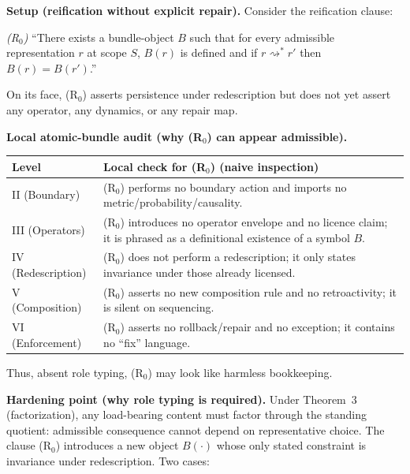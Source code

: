 \documentclass[12pt]{article}
\theoremstyle{plain}
\begin{document}
\medskip

\noindent\textbf{Setup (reification without explicit repair).} Consider the reification clause:

\medskip
\centerline{\emph{(R$_0$)} ``There exists a bundle-object $B$ such that for every admissible representation $r$ at scope $S$, $B(r)$ is defined and if $r\rightsquigarrow^* r'$ then $B(r)=B(r')$.''}
\medskip

On its face, (R$_0$) asserts persistence under redescription but does not yet assert any operator, any dynamics, or any repair map.

\medskip

\noindent\textbf{Local atomic-bundle audit (why (R$_0$) can appear admissible).}

\renewcommand{\arraystretch}{1.15}
\begin{tabular}{@{}p{}p{}@{}}
\toprule
\textbf{Level} & \textbf{Local check for (R$_0$) (naive inspection)}\\
\midrule
II (Boundary) & (R$_0$) performs no boundary action and imports no metric/probability/causality.\\
III (Operators) & (R$_0$) introduces no operator envelope and no licence claim; it is phrased as a definitional existence of a symbol $B$.\\
IV (Redescription) & (R$_0$) does not perform a redescription; it only states invariance under those already licensed.\\
V (Composition) & (R$_0$) asserts no new composition rule and no retroactivity; it is silent on sequencing.\\
VI (Enforcement) & (R$_0$) asserts no rollback/repair and no exception; it contains no ``fix'' language.\\
\bottomrule
\end{tabular}

\medskip

Thus, absent role typing, (R$_0$) may look like harmless bookkeeping.

\medskip

\noindent\textbf{Hardening point (why role typing is required).} Under Theorem~3 (factorization), any load-bearing content must factor through the standing quotient: admissible consequence cannot depend on representative choice. The clause (R$_0$) introduces a new object $B(\cdot)$ whose only stated constraint is invariance under redescription. Two cases:
\end{document}
